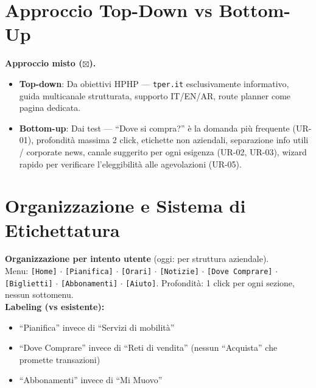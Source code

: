 ﻿\documentclass[11pt,a4paper]{article}
\begin{document}
\section{Approccio Top-Down vs Bottom-Up}

\begin{tcolorbox}[rffield]
\small
\textbf{Approccio misto ($\boxtimes$).}
\begin{itemize}[nosep]
  \item \textbf{Top-down}: Da obiettivi HPHP --- \texttt{tper.it} esclusivamente informativo, guida multicanale strutturata, supporto IT/EN/AR, route planner come pagina dedicata.
  \item \textbf{Bottom-up}: Dai test --- ``Dove si compra?'' \`e la domanda pi\`u frequente (UR-01), profondit\`a massima 2 click, etichette non aziendali, separazione info utili / corporate news, canale suggerito per ogni esigenza (UR-02, UR-03), wizard rapido per verificare l'eleggibilit\`a alle agevolazioni (UR-05).
\end{itemize}
\end{tcolorbox}

\section{Organizzazione e Sistema di Etichettatura}

\begin{tcolorbox}[rffield]
\small
\textbf{Organizzazione per intento utente} (oggi: per struttura aziendale). \\

\noindent Menu: \texttt{[Home]} $\cdot$ \texttt{[Pianifica]} $\cdot$ \texttt{[Orari]} $\cdot$ \texttt{[Notizie]} $\cdot$ \texttt{[Dove Comprare]} $\cdot$ \texttt{[Biglietti]} $\cdot$ \texttt{[Abbonamenti]} $\cdot$ \texttt{[Aiuto]}. Profondit\`a: 1 click per ogni sezione, nessun sottomenu. \\

\noindent\textbf{Labeling (vs esistente):}
\begin{itemize}[nosep]
  \item ``Pianifica'' invece di ``Servizi di mobilit\`a''
  \item ``Dove Comprare'' invece di ``Reti di vendita'' (nessun ``Acquista'' che promette transazioni)
  \item ``Abbonamenti'' invece di ``Mi Muovo''
\end{itemize}
\end{tcolorbox}
\end{document}
